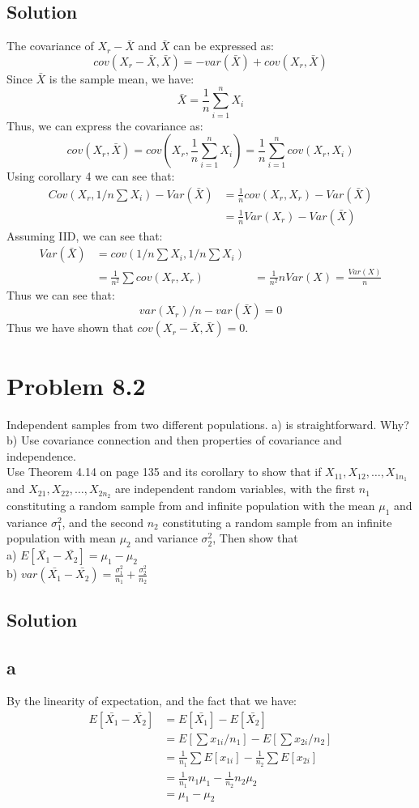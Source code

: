 \documentclass{article}
\begin{document}
\subsection*{Solution}
The covariance of $X_r - \bar{X}$ and $\bar{X}$ can be expressed as:
$$
cov(X_r - \bar{X}, \bar{X}) = -var(\bar{X}) + cov(X_r, \bar{X})
$$
Since $\bar{X}$ is the sample mean, we have:
$$ \bar{X} = \frac{1}{n} \sum_{i=1}^{n} X_i$$
Thus, we can express the covariance as:
$$
cov(X_r, \bar{X}) = cov(X_r, \frac{1}{n} \sum_{i=1}^{n} X_i) = \frac{1}{n} \sum_{i=1}^{n} cov(X_r, X_i)
$$
Using corollary 4 we can see that:
\begin{align*}
    Cov(X_r, 1/n \sum X_i) - Var(\bar{X}) &= \frac{1}{n} cov(X_r, X_r) - Var(\bar{X}) \\
    &= \frac{1}{n} Var(X_r) - Var(\bar{X}) 
\end{align*}
Assuming IID, we can see that:
\begin{align*}
    Var(\bar{X}) &= cov(1/n \sum X_i, 1/n \sum X_i) \\
    &= \frac{1}{n^2} \sum cov(X_r, X_r)
    &= \frac{1}{n^2} n Var(X) = \frac{Var(X)}{n}
\end{align*}
Thus we can see that:
$$
var(X_r)/n - var(\bar{X}) = 0
$$
Thus we have shown that $cov(X_r - \bar{X}, \bar{X}) = 0$.


\section*{Problem 8.2}
Independent samples from two different populations. 
a) is straightforward. Why? b) Use covariance connection and then properties of covariance and independence. \\
Use Theorem 4.14 on page 135 and its corollary to show that if $X_{11}, X_{12}, \ldots, X_{1n_1}$ and $X_{21}, X_{22}, \ldots, X_{2n_2}$ are independent random variables, with the first $n_1$ constituting a random sample from and infinite population with the mean $\mu_1$ and variance $\sigma_1^2$, and the second $n_2$ constituting a random sample from an infinite population with mean $\mu_2$ and variance $\sigma_2^2$, Then show that \\
a) $E[\bar{X_1} - \bar{X_2}] = \mu_1 - \mu_2$\\
b) $var(\bar{X_1} - \bar{X_2}) = \frac{\sigma_1^2}{n_1} + \frac{\sigma_2^2}{n_2}$
\subsection*{Solution}
\subsection*{a}
By the linearity of expectation, and the fact that we have:
\begin{align*}
E[\bar{X_1} - \bar{X_2}] &= E[\bar{X_1}] - E[\bar{X_2}] \\
&= E[\sum x_{1i}/n_1] - E[\sum x_{2i}/n_2] \\
&= \frac{1}{n_1} \sum E[x_{1i}] - \frac{1}{n_2} \sum E[x_{2i}] \\
&= \frac{1}{n_1} n_1 \mu_1 - \frac{1}{n_2} n_2 \mu_2 \\
&= \mu_1 - \mu_2
\end{align*}
\end{document}
